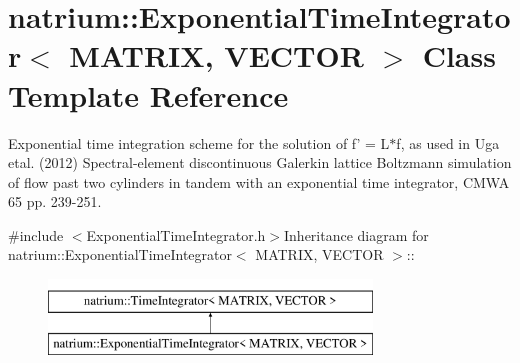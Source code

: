 \hypertarget{classnatrium_1_1ExponentialTimeIntegrator}{
\section{natrium::ExponentialTimeIntegrator$<$ MATRIX, VECTOR $>$ Class Template Reference}
\label{classnatrium_1_1ExponentialTimeIntegrator}
}


Exponential time integration scheme for the solution of f' = L$\ast$f, as used in Uga etal. (2012) Spectral-\/element discontinuous Galerkin lattice Boltzmann simulation of flow past two cylinders in tandem with an exponential time integrator, CMWA 65 pp. 239-\/251.  


{\ttfamily \#include $<$ExponentialTimeIntegrator.h$>$}Inheritance diagram for natrium::ExponentialTimeIntegrator$<$ MATRIX, VECTOR $>$::\begin{figure}[H]
\begin{center}
\leavevmode
\includegraphics[height=2cm]{classnatrium_1_1ExponentialTimeIntegrator}
\end{center}
\end{figure}
